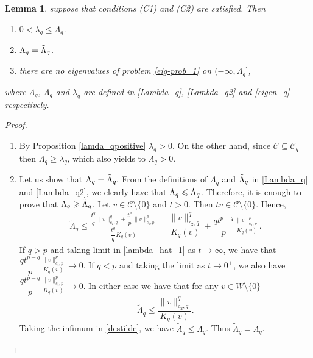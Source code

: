 \documentclass[pdflatex,sn-mathphys-num]{sn-jnl}
\theoremstyle{thmstyleone}%
\newtheorem{lem}[theorem]{Lemma}
\theoremstyle{thmstyletwo}%
\theoremstyle{thmstylethree}%
\theoremstyle{thmstylethree}%
\begin{document}
\begin{lem}\label{0<lambda_q}
suppose that conditions (C1) and (C2) are satisfied. Then 
\begin{enumerate}
    \item[(i)]  $0<\lambda_q\leqslant \Lambda_q$.
\item[(ii)]  $\Lambda_q =\Tilde{\Lambda}_q$. 
\item[(iii)] there are no eigenvalues of problem \eqref{eig-prob_1} on $(-\infty, \Lambda_q]$,    
\end{enumerate}
where $\Lambda_q$, $\tilde{\Lambda}_q$ and $\lambda_q$ are defined in \eqref{Lambda_q}, \eqref{Lambda_q2} and \eqref{eigen_q} respectively.
\end{lem}
\begin{proof}
\begin{enumerate}
    \item[(i)]  By Proposition \ref{lamda_qpositive} $\lambda_q >0$.  On the other hand, since $\mathcal{C}\subseteq \mathcal{C}_q$ then $\Lambda_q \geqslant \lambda_q$, which also yields to $\Lambda_q >0$.
\item[(ii)] Let us show that $\Lambda_q=\Tilde{\Lambda}_q.$ From the definitions of $\Lambda_q$ and $\Tilde{\Lambda}_q$ in \eqref{Lambda_q} and \eqref{Lambda_q2}, we clearly have  that  $\Lambda_q\leqslant \Tilde{\Lambda}_q$. Therefore, it is enough to prove that $\Lambda_q\geqslant\Tilde{\Lambda}_q$. Let $v\in \mathcal{C} \setminus \{0\}$ and $t>0$. Then $tv\in \mathcal{C}\setminus \{0\}$. Hence,
\begin{equation}\label{lambda_hat_1}
\begin{aligned}
    \tilde{\Lambda}_q \leqslant \frac{\dfrac{t^q}{q}\|v\|_{c_2,q}^q+\dfrac{t^p}{p}\|v\|_{c_1,p}^p}{\dfrac{t^q}{q} K_q(v)}   = \dfrac{\|v\|_{c_2,q}^q }{K_q(v)} + \dfrac{qt^{p-q}}{p}\frac{\|v\|_{c_1,p}^p}{K_q(v)}.
   \end{aligned}
\end{equation}
If $q>p$ and taking limit in \eqref{lambda_hat_1} as $t\to \infty$, we have that $\dfrac{qt^{p-q}}{p}\frac{\|v\|_{c_1,p}^p}{K_q(v)}\to 0$. If $q<p$ and taking the limit as $t\to 0^+$, we also have $\dfrac{qt^{p-q}}{p}\frac{\|v\|_{c_1,p}^p}{K_q(v)}\to 0$. In either case we have that for any $v\in W\setminus \{0\}$
\begin{equation}\label{destilde}
\tilde{\Lambda}_q \leqslant \frac{\|v\|_{c_2,q}^q}{K_q(v)}.
\end{equation}
Taking the infimum in \eqref{destilde}, we have  $\tilde{\Lambda}_q \leqslant \Lambda_q$. Thus $\tilde{\Lambda}_q = \Lambda_q$.

\end{enumerate}
\end{proof}
\end{document}
